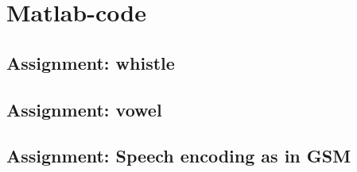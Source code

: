 \chapter{Matlab-code}
\section{Assignment: whistle}

\section{Assignment: vowel}

\section{Assignment: Speech encoding as in GSM}
